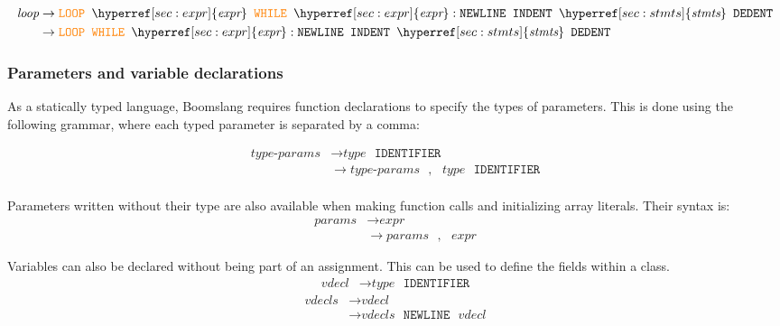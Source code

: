 \documentclass{article}
\begin{document}
\label{sec:loop}
\begin{align*}
    \textit{loop} &\to \textcolor{orange}{\texttt{LOOP}} \texttt{ } \hyperref[sec:expr]{\textit{expr}} \texttt{ } \textcolor{orange}{\texttt{WHILE}} \texttt{ } \hyperref[sec:expr]{\textit{expr}}: \texttt{NEWLINE} \texttt{ } \texttt{INDENT} \texttt{ } \hyperref[sec:stmts]{\textit{stmts}} \texttt{ } \texttt{DEDENT} \\
    &\to \textcolor{orange}{\texttt{LOOP}} \texttt{ } \textcolor{orange}{\texttt{WHILE}} \texttt{ } \hyperref[sec:expr]{\textit{expr}}: \texttt{NEWLINE} \texttt{ } \texttt{INDENT} \texttt{ } \hyperref[sec:stmts]{\textit{stmts}} \texttt{ } \texttt{DEDENT} \\
\end{align*}

\subsubsection{Parameters and variable declarations}
As a statically typed language, Boomslang requires function declarations to specify the types of parameters. This is done using the following grammar, where each typed parameter is separated by a comma:

\label{sec:type-params}
\begin{align*}
    \textit{type-params} &\to \hyperref[sec:type]{\textit{type}} \texttt{ } \texttt{IDENTIFIER} \\
    &\to \hyperref[sec:type-params]{\textit{type-params}} \texttt{ }, \texttt{ } \hyperref[sec:type]{\textit{type}} \texttt{ } \texttt{IDENTIFIER} \\
\end{align*}

Parameters written without their type are also available when making function calls and initializing array literals. Their syntax is:
\label{sec:params}
\begin{align*}
    \textit{params} &\to \hyperref[sec:expr]{\textit{expr}} \\
    &\to \hyperref[sec:params]{\textit{params}} \texttt{ } , \texttt{ } \hyperref[sec:expr]{\textit{expr}}
\end{align*}

Variables can also be declared without being part of an assignment. This can be used to define the fields within a class.
\label{sec:vdecl}
\begin{align*}
    \textit{vdecl} &\to \hyperref[sec:type]{\textit{type}} \texttt{ } \texttt{IDENTIFIER}
\end{align*}
\label{sec:vdecls}
\begin{align*}
    \textit{vdecls} &\to \hyperref[sec:vdecl]{\textit{vdecl}} \\ &\to \hyperref[sec:vdecls]{\textit{vdecls}} \texttt{ } \texttt{NEWLINE} \texttt{ } \hyperref[sec:vdecl]{\textit{vdecl}}
\end{align*}
\end{document}
